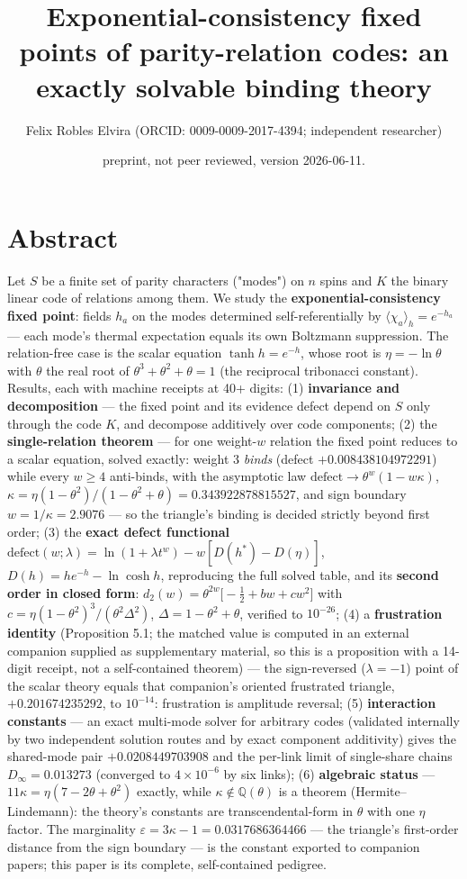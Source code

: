 \documentclass[11pt]{article}
\title{Exponential-consistency fixed points of parity-relation codes: an exactly solvable binding theory}
\author{Felix Robles Elvira (ORCID: 0009-0009-2017-4394; independent researcher)}
\date{\small preprint, not peer reviewed, version 2026-06-11.}
\begin{document}
\maketitle

\section*{Abstract}
Let $S$ be a finite set of parity characters ("modes") on $n$ spins and $K$ the binary linear code of relations among them.  We study the \textbf{exponential-consistency fixed point}: fields $h_a$ on the modes determined self-referentially by $\langle\chi_a\rangle_h = e^{-h_a}$ — each mode's thermal expectation equals its own Boltzmann suppression.  The relation-free case is the scalar equation $\tanh h = e^{-h}$, whose root is $\eta = -\ln\theta$ with $\theta$ the real root of $\theta^3 + \theta^2 + \theta = 1$ (the reciprocal tribonacci constant).  Results, each with machine receipts at 40+ digits: (1) \textbf{invariance and decomposition} — the fixed point and its evidence defect depend on $S$ only through the code $K$, and decompose additively over code components; (2) the \textbf{single-relation theorem} — for one weight-$w$ relation the fixed point reduces to a scalar equation, solved exactly: weight 3 \emph{binds} (defect $+0.008438104972291$) while every $w \ge 4$ anti-binds, with the asymptotic law $\mathrm{defect} \to \theta^w(1 - w\kappa)$, $\kappa = \eta(1-\theta^2)/(1-\theta^2+\theta) = 0.343922878815527$, and sign boundary $w = 1/\kappa = 2.9076$ — so the triangle's binding is decided strictly beyond first order; (3) the \textbf{exact defect functional} $\mathrm{defect}(w;\lambda) = \ln(1+\lambda t^w) - w[D(h^*) - D(\eta)]$, $D(h) = he^{-h} - \ln\cosh h$, reproducing the full solved table, and its \textbf{second order in closed form}: $d_2(w) = \theta^{2w}\bigl[-\tfrac12 + bw + cw^2\bigr]$ with $c = \eta(1-\theta^2)^3/(\theta^2\Delta^2)$, $\Delta = 1-\theta^2+\theta$, verified to $10^{-26}$; (4) a \textbf{frustration identity} (Proposition 5.1; the matched value is computed in an external companion supplied as supplementary material, so this is a proposition with a 14-digit receipt, not a self-contained theorem) — the sign-reversed ($\lambda = -1$) point of the scalar theory equals that companion's oriented frustrated triangle, $+0.201674235292$, to $10^{-14}$: frustration is amplitude reversal; (5) \textbf{interaction constants} — an exact multi-mode solver for arbitrary codes (validated internally by two independent solution routes and by exact component additivity) gives the shared-mode pair $+0.0208449703908$ and the per-link limit of single-share chains $D_\infty = 0.013273$ (converged to $4\times 10^{-6}$ by six links); (6) \textbf{algebraic status} — $11\kappa = \eta(7 - 2\theta + \theta^2)$ exactly, while $\kappa \notin \mathbb Q(\theta)$ is a theorem (Hermite–Lindemann): the theory's constants are transcendental-form in $\theta$ with one $\eta$ factor.  The marginality $\varepsilon = 3\kappa - 1 = 0.0317686364466$ — the triangle's first-order distance from the sign boundary — is the constant exported to companion papers; this paper is its complete, self-contained pedigree.
\end{document}

